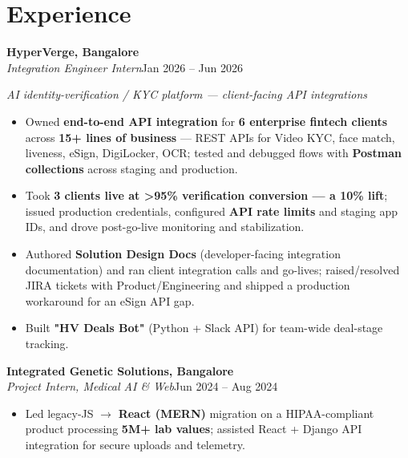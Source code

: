 \documentclass[10pt,a4paper]{article}
\begin{document}
\section*{Experience}
\vspace{1pt}\textbf{HyperVerge, Bangalore}\\
\textit{Integration Engineer Intern}\hfill Jan 2026 -- Jun 2026\par\vspace{1pt}
{\small\itshape AI identity-verification / KYC platform --- client-facing API integrations}\par\vspace{1pt}
\begin{itemize}
\item Owned \textbf{end-to-end API integration} for \textbf{6 enterprise fintech clients} across \textbf{15+ lines of business} --- REST APIs for Video KYC, face match, liveness, eSign, DigiLocker, OCR; tested and debugged flows with \textbf{Postman collections} across staging and production.
\item Took \textbf{3 clients live at \textgreater{}95\% verification conversion --- a 10\% lift}; issued production credentials, configured \textbf{API rate limits} and staging app IDs, and drove post-go-live monitoring and stabilization.
\item Authored \textbf{Solution Design Docs} (developer-facing integration documentation) and ran client integration calls and go-lives; raised/resolved JIRA tickets with Product/Engineering and shipped a production workaround for an eSign API gap.
\item Built \textbf{"HV Deals Bot"} (Python + Slack API) for team-wide deal-stage tracking.
\end{itemize}
\vspace{1pt}\textbf{Integrated Genetic Solutions, Bangalore}\\
\textit{Project Intern, Medical AI \& Web}\hfill Jun 2024 -- Aug 2024\par\vspace{1pt}
\begin{itemize}
\item Led legacy-JS $\rightarrow$ \textbf{React (MERN)} migration on a HIPAA-compliant product processing \textbf{5M+ lab values}; assisted React + Django API integration for secure uploads and telemetry.
\end{itemize}
\end{document}

